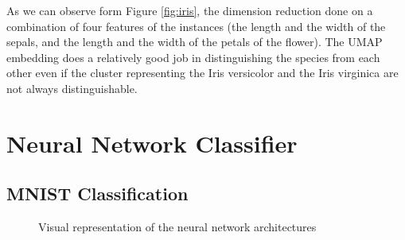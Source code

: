 \documentclass[paper=a4, fontsize=11pt]{scrartcl}
\numberwithin{equation}{section}		%
\numberwithin{figure}{section}			%
\numberwithin{table}{section}				%
\begin{document}
As we can observe form Figure \ref{fig:iris}, the dimension reduction done on a combination of four features of the instances (the length and the width of the sepals, and the length and the width of the petals of the flower). The UMAP embedding does a relatively good job in distinguishing the species from each other even if the cluster representing the Iris versicolor and the Iris virginica are not always distinguishable.

\FloatBarrier

\section{Neural Network Classifier}
\subsection{MNIST Classification}

\begin{figure}[!hbt]
\begin{center}
\end{center}
\caption{Visual representation of the neural network architectures}
\label{fig:NN}
\end{figure}
\end{document}
